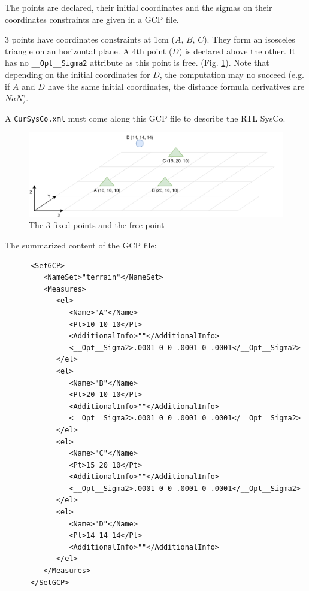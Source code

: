 The points are declared, their initial coordinates and the sigmas on their coordinates constraints
are given in a GCP file. 

3 points have coordinates constraints at 1cm ($A$, $B$, $C$). They form an isosceles triangle
on an horizontal plane.
A 4th point ($D$) is declared above the other. It has no {\tt \_\_Opt\_\_Sigma2} attribute as this point is free.
(Fig. \ref{fig:topoEx1}). Note that depending on the initial coordinates for $D$, the computation may no succeed
(e.g. if $A$ and $D$ have the same initial coordinates, the distance formula derivatives are $NaN$).

A {\tt CurSysCo.xml} must come along this GCP file to describe the RTL SysCo.


\begin{figure}[!h]
\centering
\includegraphics[width=12cm]{Programmer/benchtopo1b.png}
\caption{The 3 fixed points and the free point}
\label{fig:topoEx1}
\end{figure}

The summarized content of the GCP file:

\begin{lstlisting}
      <SetGCP>
         <NameSet>"terrain"</NameSet>
         <Measures>
            <el>
               <Name>"A"</Name>
               <Pt>10 10 10</Pt>
               <AdditionalInfo>""</AdditionalInfo>
               <__Opt__Sigma2>.0001 0 0 .0001 0 .0001</__Opt__Sigma2>
            </el>
            <el>
               <Name>"B"</Name>
               <Pt>20 10 10</Pt>
               <AdditionalInfo>""</AdditionalInfo>
               <__Opt__Sigma2>.0001 0 0 .0001 0 .0001</__Opt__Sigma2>
            </el>
            <el>
               <Name>"C"</Name>
               <Pt>15 20 10</Pt>
               <AdditionalInfo>""</AdditionalInfo>
               <__Opt__Sigma2>.0001 0 0 .0001 0 .0001</__Opt__Sigma2>
            </el>
            <el>
               <Name>"D"</Name>
               <Pt>14 14 14</Pt>
               <AdditionalInfo>""</AdditionalInfo>
            </el>
         </Measures>
      </SetGCP>
\end{lstlisting}


